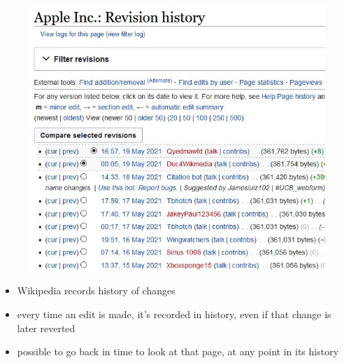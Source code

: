\documentclass[english,14pt]{beamer}
\begin{document}
\begin{frame}[fragile]

\frametitle{}

\vspace*{-5mm}

\begin{figure}[ht]
	\centering
	\includegraphics[width=.45\textwidth]{figures/AppleWiki}
\end{figure}

\vspace*{-5mm}

\begin{itemize}
	\item Wikipedia records history of changes
	\item every time an edit is made, it's recorded in history, even if that change is later reverted
	\item possible to go back in time to look at that page, at any point in its history
\end{itemize}

\end{frame}

\end{document}
